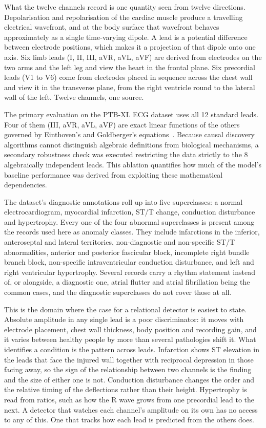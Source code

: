 What the twelve channels record is one quantity seen from twelve directions. Depolarisation and repolarisation of the cardiac muscle produce a travelling electrical wavefront, and at the body surface that wavefront behaves approximately as a single time-varying dipole. A lead is a potential difference between electrode positions, which makes it a projection of that dipole onto one axis. Six limb leads (I, II, III, aVR, aVL, aVF) are derived from electrodes on the two arms and the left leg and view the heart in the frontal plane. Six precordial leads (V1 to V6) come from electrodes placed in sequence across the chest wall and view it in the transverse plane, from the right ventricle round to the lateral wall of the left. Twelve channels, one source.

The primary evaluation on the PTB-XL ECG dataset uses all 12 standard leads. Four of them (III, aVR, aVL, aVF) are exact linear functions of the others governed by Einthoven's and Goldberger's equations~\cite{malmivuo1995bioelectromagnetism,goldberger1942augmented}. Because causal discovery algorithms cannot distinguish algebraic definitions from biological mechanisms, a secondary robustness check was executed restricting the data strictly to the 8 algebraically independent leads. This ablation quantifies how much of the model's baseline performance was derived from exploiting these mathematical dependencies.

The dataset's diagnostic annotations roll up into five superclasses: a normal electrocardiogram, myocardial infarction, ST/T change, conduction disturbance and hypertrophy. Every one of the four abnormal superclasses is present among the records used here as anomaly classes. They include infarctions in the inferior, anteroseptal and lateral territories, non-diagnostic and non-specific ST/T abnormalities, anterior and posterior fascicular block, incomplete right bundle branch block, non-specific intraventricular conduction disturbance, and left and right ventricular hypertrophy. Several records carry a rhythm statement instead of, or alongside, a diagnostic one, atrial flutter and atrial fibrillation being the common cases, and the diagnostic superclasses do not cover those at all.

This is the domain where the case for a relational detector is easiest to state. Absolute amplitude in any single lead is a poor discriminator: it moves with electrode placement, chest wall thickness, body position and recording gain, and it varies between healthy people by more than several pathologies shift it. What identifies a condition is the pattern across leads. Infarction shows ST elevation in the leads that face the injured wall together with reciprocal depression in those facing away, so the sign of the relationship between two channels is the finding and the size of either one is not. Conduction disturbance changes the order and the relative timing of the deflections rather than their height. Hypertrophy is read from ratios, such as how the R wave grows from one precordial lead to the next. A detector that watches each channel's amplitude on its own has no access to any of this. One that tracks how each lead is predicted from the others does.

